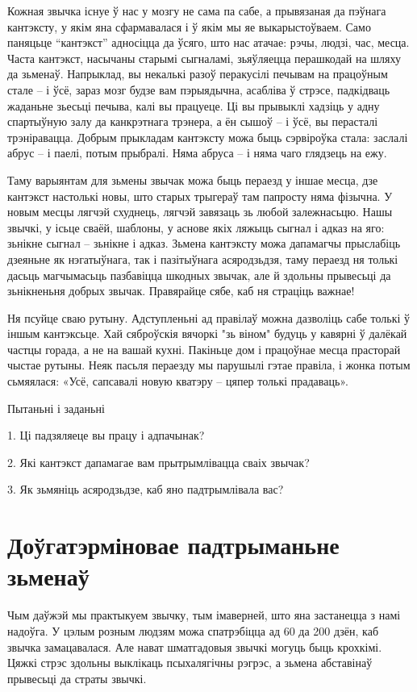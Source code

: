 Кожная звычка існуе ў нас у мозгу не сама па сабе, а прывязаная да пэўнага кантэксту, у якім яна сфармавалася і ў якім мы яе выкарыстоўваем. Само паняцьце “кантэкст” адносіцца да ўсяго, што нас атачае: рэчы, людзі, час, месца. Часта кантэкст, насычаны старымі сыгналамі, зьяўляецца перашкодай на шляху да зьменаў. Напрыклад, вы некалькі разоў перакусілі печывам на працоўным стале – і ўсё, зараз мозг будзе вам пэрыядычна, асабліва ў стрэсе, падкідваць жаданьне зьесьці печыва, калі вы працуеце. Ці вы прывыклі хадзіць у адну спартыўную залу да канкрэтнага трэнера, а ён сышоў – і ўсё, вы перасталі трэніравацца. Добрым прыкладам кантэксту можа быць сэрвіроўка стала: заслалі абрус – і паелі, потым прыбралі. Няма абруса – і няма чаго глядзець на ежу. 

Таму варыянтам для зьмены звычак можа быць пераезд у іншае месца, дзе кантэкст настолькі новы, што старых трыгераў там папросту няма фізычна. У новым месцы лягчэй схуднець, лягчэй завязаць зь любой залежнасьцю. Нашы звычкі, у ісьце сваёй, шаблоны, у аснове якіх ляжыць сыгнал і адказ на яго: зьнікне сыгнал – зьнікне і адказ. Зьмена кантэксту можа дапамагчы прыслабіць дзеяньне як нэгатыўнага, так і пазітыўнага асяродзьдзя, таму пераезд ня толькі дасьць магчымасьць пазбавіцца шкодных звычак, але й здольны прывесьці да зьнікненьня добрых звычак. Правярайце сябе, каб ня страціць важнае! 

Ня псуйце сваю рутыну. Адступленьні ад правілаў можна дазволіць сабе толькі ў іншым кантэксьце. Хай сяброўскія вячоркі "зь віном" будуць у кавярні ў далёкай частцы горада, а не на вашай кухні. Пакіньце дом і працоўнае месца прасторай чыстае рутыны. Неяк пасьля пераезду мы парушылі гэтае правіла, і жонка потым сьмяялася: «Усё, сапсавалі новую кватэру – цяпер толькі прадаваць».

Пытаньні і заданьні

1. Ці падзяляеце вы працу і адпачынак?

2. Які кантэкст дапамагае вам прытрымлівацца сваіх звычак?

3. Як зьмяніць асяродзьдзе, каб яно падтрымлівала вас?


\section{Доўгатэрміновае падтрыманьне зьменаў}

Чым даўжэй мы практыкуем звычку, тым імаверней, што яна застанецца з намі надоўга. У цэлым розным людзям можа спатрэбіцца ад 60 да 200 дзён, каб звычка замацавалася. Але нават шматгадовыя звычкі могуць быць крохкімі. Цяжкі стрэс здольны выклікаць псыхалягічны рэгрэс, а зьмена абставінаў прывесьці да страты звычкі. 

